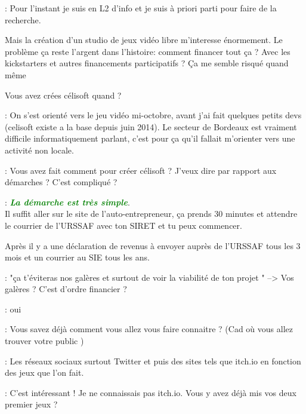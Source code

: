 \documentclass[a4paper,12pt, draft]{report}
\newcommand{\goodPoint}[1]{\textcolor{green}{\textbf{\textit{#1}}}}
\begin{document}
\begin{description}
\item 
\item [Question]: Pour l'instant je suis en L2 d'info et je suis à priori parti pour faire de la recherche.
\item Mais la création d'un studio de jeux vidéo libre m'interesse énormement. Le problème ça reste l'argent dans l'histoire: comment financer tout ça ? Avec les kickstarters et autres financements participatifs ? Ça me semble risqué quand même  
\item 
\item Vous avez crées célisoft quand ?
\item 
\item [Réponse]: On s'est orienté vers le jeu vidéo mi-octobre, avant j'ai fait quelques petits devs (celisoft existe a la base depuis juin 2014). Le secteur de Bordeaux est vraiment difficile informatiquement parlant, c'est pour ça qu'il fallait m'orienter vers une activité non locale.
\item 
\item [Question]: Vous avez fait comment pour créer célisoft ? J'veux dire par rapport aux démarches ? C'est compliqué ?
\item 
\item [Réponse]: \goodPoint{La démarche est très simple}. \\Il suffit aller sur le site de l'auto-entrepreneur, ça prends 30 minutes et attendre le courrier de l'URSSAF avec ton SIRET et tu peux commencer.
\item Après il y a une déclaration de revenus à envoyer auprès de l'URSSAF tous les 3 mois et un courrier au SIE tous les ans.
\item 
\item [Question]: "ça t'éviteras nos galères et surtout de voir la viabilité de ton projet " --> Vos galères ? C'est d'ordre financier ?
\item 
\item [Réponse]: oui  
\item 
\item [Question]: Vous savez déjà comment vous allez vous faire connaitre ? (Cad où vous allez trouver votre public )
\item 
\item [Réponse]: Les réseaux sociaux surtout Twitter et puis des sites tels que itch.io en fonction des jeux que l'on fait.
\item 
\item [Question]: C'est intéressant ! Je ne connaissais pas itch.io. Vous y avez déjà mis vos deux premier jeux ?

\end{description}
\end{document}
